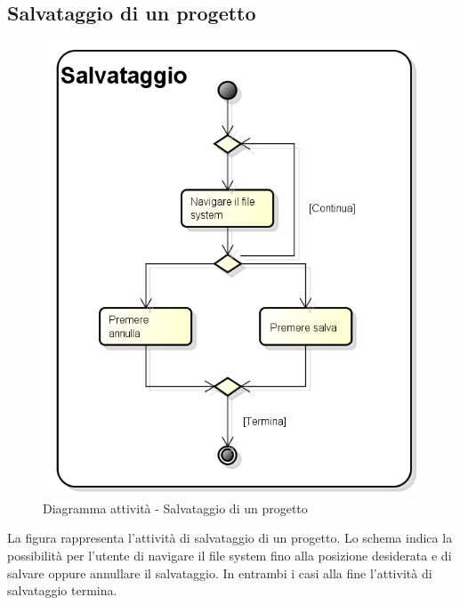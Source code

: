 \subsection{Salvataggio di un progetto}
\begin{figure}[h] 
	\centering 
	\includegraphics[width=0.6\linewidth] {img/activity_salvataggio.png}
	\caption{Diagramma attività - Salvataggio di un progetto} 
\end{figure}
La figura rappresenta l'attività di salvataggio di un progetto. Lo schema indica la possibilità per l'utente di navigare il file system fino alla posizione desiderata e di salvare oppure annullare il salvataggio. In entrambi i casi alla fine l'attività di salvataggio termina.
\newpage
